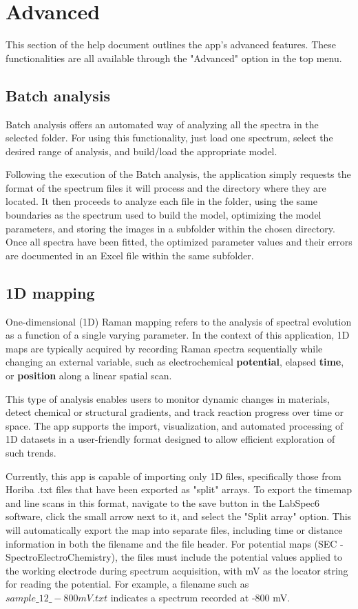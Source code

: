 \chapter{Advanced}
\label{cha:Advanced}
This section of the help document outlines the app's advanced features. These functionalities are all available through the "Advanced" option in the top menu.

\section{Batch analysis}
Batch analysis offers an automated way of analyzing all the spectra in the selected folder. For using this functionality, just load one spectrum, select the desired range of analysis, and build/load the appropriate model.

Following the execution of the Batch analysis, the application simply requests the format of the spectrum files it will process and the directory where they are located. It then proceeds to analyze each file in the folder, using the same boundaries as the spectrum used to build the model, optimizing the model parameters, and storing the images in a subfolder within the chosen directory. Once all spectra have been fitted, the optimized parameter values and their errors are documented in an Excel file within the same subfolder.

\section{1D mapping}

One-dimensional (1D) Raman mapping refers to the analysis of spectral evolution as a function of a single varying parameter. In the context of this application, 1D maps are typically acquired by recording Raman spectra sequentially while changing an external variable, such as electrochemical \textbf{potential}, elapsed \textbf{time}, or \textbf{position} along a linear spatial scan.

This type of analysis enables users to monitor dynamic changes in materials, detect chemical or structural gradients, and track reaction progress over time or space. The app supports the import, visualization, and automated processing of 1D datasets in a user-friendly format designed to allow efficient exploration of such trends.

Currently, this app is capable of importing only 1D files, specifically those from Horiba .txt files that have been exported as "split" arrays. To export the timemap and line scans in this format, navigate to the save button in the LabSpec6 software, click the small arrow next to it, and select the "Split array" option. This will automatically export the map into separate files, including time or distance information in both the filename and the file header. For potential maps (SEC - SpectroElectroChemistry), the files must include the potential values applied to the working electrode during spectrum acquisition, with mV as the locator string for reading the potential. For example, a filename such as \textit{$sample\_12\_-800mV.txt$} indicates a spectrum recorded at -800 mV.

